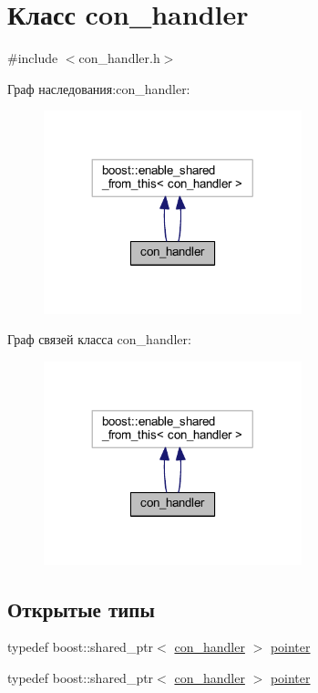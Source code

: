 \hypertarget{classcon__handler}{}\section{Класс con\+\_\+handler}
\label{classcon__handler}


{\ttfamily \#include $<$con\+\_\+handler.\+h$>$}



Граф наследования\+:con\+\_\+handler\+:\nopagebreak
\begin{figure}[H]
\begin{center}
\leavevmode
\includegraphics[width=212pt]{classcon__handler__inherit__graph}
\end{center}
\end{figure}


Граф связей класса con\+\_\+handler\+:\nopagebreak
\begin{figure}[H]
\begin{center}
\leavevmode
\includegraphics[width=212pt]{classcon__handler__coll__graph}
\end{center}
\end{figure}
\subsection*{Открытые типы}
\begin{DoxyCompactItemize}
\item 
typedef boost\+::shared\+\_\+ptr$<$ \mbox{\hyperlink{classcon__handler}{con\+\_\+handler}} $>$ \mbox{\hyperlink{classcon__handler_ada4a1b970f9fd8e55460a58cf7f7ce2c}{pointer}}
\item 
typedef boost\+::shared\+\_\+ptr$<$ \mbox{\hyperlink{classcon__handler}{con\+\_\+handler}} $>$ \mbox{\hyperlink{classcon__handler_ada4a1b970f9fd8e55460a58cf7f7ce2c}{pointer}}
\end{DoxyCompactItemize}
